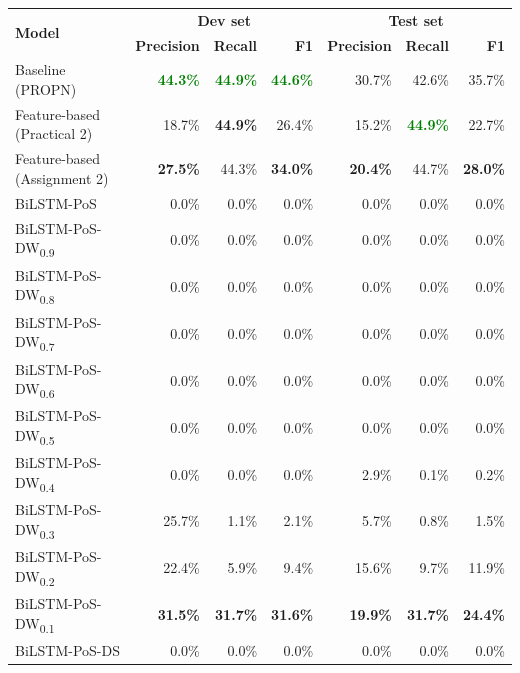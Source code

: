 \documentclass[11pt,a4paper]{article}
\begin{document}
\begin{table}
    \centering
    \begin{tabular}{lrrrrrr}
        \hline
        \multirow{2}{*}{\textbf{Model}} & \multicolumn{3}{c}{\textbf{Dev set}} & \multicolumn{3}{c}{\textbf{Test set}} \\
        \cline{2-7}
        {} & \textbf{Precision} & \textbf{Recall} & \textbf{F1} & \textbf{Precision} & \textbf{Recall} & \textbf{F1} \\
        \hline
        Baseline (PROPN) & \textcolor{Green}{\textbf{44.3\%}} & \textcolor{Green}{\textbf{44.9\%}} & \textcolor{Green}{\textbf{44.6\%}} & 30.7\% & 42.6\% & 35.7\% \\
        \hline
        Feature-based (Practical 2)  & 18.7\% & \textbf{44.9\%} & 26.4\% & 15.2\% & \textcolor{Green}{\textbf{44.9\%}} & 22.7\% \\
        Feature-based (Assignment 2) & \textbf{27.5\%} & 44.3\% & \textbf{34.0\%} & \textbf{20.4\%} & 44.7\% & \textbf{28.0\%} \\
        \hline
        BiLSTM-PoS & 0.0\% & 0.0\% & 0.0\% & 0.0\% & 0.0\% & 0.0\% \\
        BiLSTM-PoS-DW\textsubscript{0.9} &  0.0\% &  0.0\% &  0.0\% &  0.0\% &  0.0\% &  0.0\% \\
        BiLSTM-PoS-DW\textsubscript{0.8} &  0.0\% &  0.0\% &  0.0\% &  0.0\% &  0.0\% &  0.0\% \\
        BiLSTM-PoS-DW\textsubscript{0.7} &  0.0\% &  0.0\% &  0.0\% &  0.0\% &  0.0\% &  0.0\% \\
        BiLSTM-PoS-DW\textsubscript{0.6} &  0.0\% &  0.0\% &  0.0\% &  0.0\% &  0.0\% &  0.0\% \\
        BiLSTM-PoS-DW\textsubscript{0.5} &  0.0\% &  0.0\% &  0.0\% &  0.0\% &  0.0\% &  0.0\% \\
        BiLSTM-PoS-DW\textsubscript{0.4} &  0.0\% &  0.0\% &  0.0\% &  2.9\% &  0.1\% &  0.2\% \\
        BiLSTM-PoS-DW\textsubscript{0.3} & 25.7\% &  1.1\% &  2.1\% &  5.7\% &  0.8\% &  1.5\% \\
        BiLSTM-PoS-DW\textsubscript{0.2} & 22.4\% &  5.9\% &  9.4\% & 15.6\% &  9.7\% & 11.9\% \\
        BiLSTM-PoS-DW\textsubscript{0.1} & \textbf{31.5\%} & \textbf{31.7\%} & \textbf{31.6\%} & \textbf{19.9\%} & \textbf{31.7\%} & \textbf{24.4\%} \\
        \hline
        BiLSTM-PoS-DS & 0.0\% & 0.0\% & 0.0\% & 0.0\% & 0.0\% & 0.0\% \\

\end{tabular}
\end{table}
\end{document}
